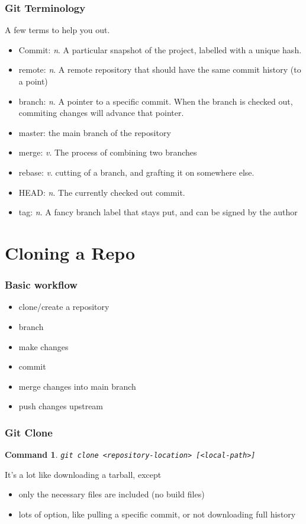 \documentclass{beamer}
\newtheorem{command}[theorem]{Command}
\begin{document}
\begin{frame}
    \frametitle{Git Terminology}
    A few terms to help you out.
    \begin{itemize}
        \item Commit: \emph{n}. A particular snapshot of the project, labelled with a unique hash.
        \item remote: \emph{n}. A remote repository that should have the same commit history (to a point)
        \item branch: \emph{n}. A pointer to a specific commit. When the branch is checked out, commiting changes will advance that pointer.
        \item master: the main branch of the repository
        \item merge: \emph{v}. The process of combining two branches
        \item rebase: \emph{v}. cutting of a branch, and grafting it on somewhere else.
        \item HEAD: \emph{n}. The currently checked out commit.
        \item tag: \emph{n}. A fancy branch label that stays put, and can be signed by the author
    \end{itemize}
\end{frame}

\section{Cloning a Repo}

\begin{frame}
    \frametitle{Basic workflow}
    \begin{itemize}
        \item clone/create a repository
        \item branch
        \item make changes
        \item commit
        \item merge changes into main branch
        \item push changes upstream
    \end{itemize}
\end{frame}

\begin{frame}
    \frametitle{Git Clone}
    \begin{command}
        \texttt{git clone <repository-location> [<local-path>]}
    \end{command}
    It's a lot like downloading a tarball, except
    \begin{itemize}
        \item only the necessary files are included (no build files)
        \item lots of option, like pulling a specific commit, or not downloading full history
    \end{itemize}
\end{frame}
\end{document}
